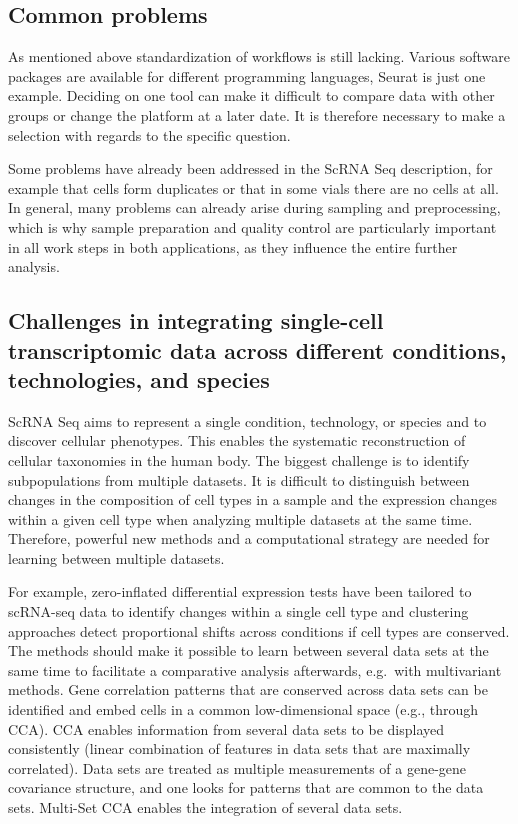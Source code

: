 \documentclass[a4paper, 10pt]{scrartcl}
\begin{document}
\hypertarget{common-problems}{%
\subsection{Common problems}\label{common-problems}}

As mentioned above standardization of workflows is still lacking.
Various software packages are available for different programming
languages, Seurat is just one example. Deciding on one tool can make it
difficult to compare data with other groups or change the platform at a
later date. It is therefore necessary to make a selection with regards
to the specific question.

Some problems have already been addressed in the ScRNA Seq description,
for example that cells form duplicates or that in some vials there are
no cells at all. In general, many problems can already arise during
sampling and preprocessing, which is why sample preparation and quality
control are particularly important in all work steps in both
applications, as they influence the entire further analysis.

\hypertarget{challenges-in-integrating-single-cell-transcriptomic-data-across-different-conditions-technologies-and-species}{%
\subsection{Challenges in integrating single-cell transcriptomic data
across different conditions, technologies, and
species}\label{challenges-in-integrating-single-cell-transcriptomic-data-across-different-conditions-technologies-and-species}}

ScRNA Seq aims to represent a single condition, technology, or species
and to discover cellular phenotypes. This enables the systematic
reconstruction of cellular taxonomies in the human body. The biggest
challenge is to identify subpopulations from multiple datasets. It is
difficult to distinguish between changes in the composition of cell
types in a sample and the expression changes within a given cell type
when analyzing multiple datasets at the same time. Therefore, powerful
new methods and a computational strategy are needed for learning between
multiple datasets.

For example, zero-inflated differential expression tests have been
tailored to scRNA-seq data to identify changes within a single cell type
and clustering approaches detect proportional shifts across conditions
if cell types are conserved. The methods should make it possible to
learn between several data sets at the same time to facilitate a
comparative analysis afterwards, e.g.~with multivariant methods. Gene
correlation patterns that are conserved across data sets can be
identified and embed cells in a common low-dimensional space (e.g.,
through CCA). CCA enables information from several data sets to be
displayed consistently (linear combination of features in data sets that
are maximally correlated). Data sets are treated as multiple
measurements of a gene-gene covariance structure, and one looks for
patterns that are common to the data sets. Multi-Set CCA enables the
integration of several data sets.
\end{document}
